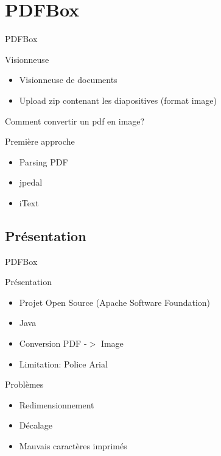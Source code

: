 \section{PDFBox}

\begin{frame}{PDFBox}
  	\begin{block}{Visionneuse}
  		 \begin{itemize}
	   		\item Visionneuse de documents
      		\item Upload zip contenant les diapositives (format image)
	 	\end{itemize}
  	\end{block}

	Comment convertir un pdf en image?

	\begin{block}{Première approche}
  		\begin{itemize}
      			\item Parsing PDF
      			\item jpedal
      			\item iText
  		\end{itemize}
	\end{block}
\end{frame}

\subsection{Présentation}
\begin{frame}{PDFBox}
	\begin{block}{Présentation}
		\begin{itemize}
			\item Projet Open Source (Apache Software Foundation)
			\item Java 
			\item Conversion PDF -$>$ Image
			\item Limitation: Police Arial
		\end{itemize}
	\end{block}

	\begin{block}{Problèmes}
		\begin{itemize}
			\item Redimensionnement
			\item Décalage
			\item Mauvais caractères imprimés
		\end{itemize}
	\end{block}
\end{frame}

